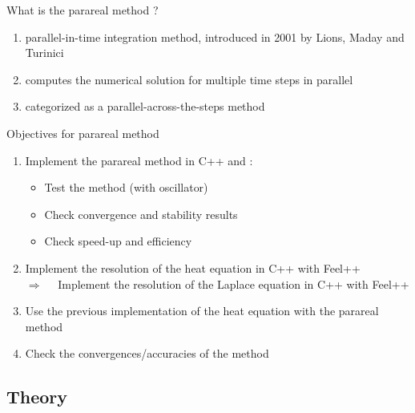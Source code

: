 \begin{frame}{What is the parareal method ?}
	
	\begin{enumerate}[\textbullet]
		\item parallel-in-time integration method, introduced in 2001 by Lions, Maday and Turinici
		\item computes the numerical solution for multiple time steps in parallel
		\item categorized as a parallel-across-the-steps method 
	\end{enumerate}

\end{frame}

\begin{frame}{Objectives for parareal method}
	
	\begin{enumerate}[\textbullet]
		\item Implement the parareal method in C++ and :
		\begin{itemize}
			\item Test the method (with oscillator)
			\item Check convergence and stability results
			\item Check speed-up and efficiency 
		\end{itemize}
		\item Implement the resolution of the heat equation in C++ with Feel++ \\
		$\Rightarrow \quad $ Implement the resolution of the Laplace equation in C++ with Feel++ \\
		\item Use the previous implementation of the heat equation with the parareal method
		\item Check the convergences/accuracies of the method
	\end{enumerate}
	
\end{frame}


\subsection{Theory}

